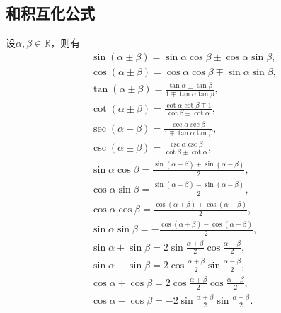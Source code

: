 \subsection{和积互化公式}
\begin{theorem}[和积互化公式]
设\(\alpha,\beta\in\mathbb{R}\)，则有
\begin{gather}
	\sin(\alpha\pm\beta) = \sin\alpha\cos\beta\pm\cos\alpha\sin\beta,
	\label{equation:函数.三角函数.和积互化公式1} \\
	\cos(\alpha\pm\beta) = \cos\alpha\cos\beta\mp\sin\alpha\sin\beta,
	\label{equation:函数.三角函数.和积互化公式2} \\
	\tan(\alpha\pm\beta) = \frac{\tan\alpha\pm\tan\beta}{1\mp\tan\alpha\tan\beta},
	\label{equation:函数.三角函数.和积互化公式3} \\
	\cot(\alpha\pm\beta) = \frac{\cot\alpha\cot\beta\mp 1}{\cot\beta\pm\cot\alpha},
	\label{equation:函数.三角函数.和积互化公式4} \\
	\sec(\alpha\pm\beta) = \frac{\sec\alpha\sec\beta}{1\mp\tan\alpha\tan\beta},
	\label{equation:函数.三角函数.和积互化公式5} \\
	\csc(\alpha\pm\beta) = \frac{\csc\alpha\csc\beta}{\cot\beta\pm\cot\alpha},
	\label{equation:函数.三角函数.和积互化公式6} \\
	\sin \alpha \cos \beta = \frac{\sin (\alpha + \beta) + \sin (\alpha - \beta)}{2},
	\label{equation:函数.三角函数.和积互化公式7} \\
	\cos \alpha \sin \beta = \frac{\sin (\alpha + \beta) - \sin (\alpha - \beta)}{2},
	\label{equation:函数.三角函数.和积互化公式8} \\
	\cos \alpha \cos \beta = \frac{\cos (\alpha + \beta) + \cos (\alpha - \beta)}{2},
	\label{equation:函数.三角函数.和积互化公式9} \\
	\sin \alpha \sin \beta = -\frac{\cos (\alpha + \beta) - \cos (\alpha - \beta)}{2},
	\label{equation:函数.三角函数.和积互化公式10} \\
	\sin \alpha + \sin \beta = 2 \sin \frac{\alpha + \beta}{2} \cos \frac{\alpha - \beta}{2},
	\label{equation:函数.三角函数.和积互化公式11} \\
	\sin \alpha - \sin \beta = 2 \cos \frac{\alpha + \beta}{2} \sin \frac{\alpha - \beta}{2},
	\label{equation:函数.三角函数.和积互化公式12} \\
	\cos \alpha + \cos \beta = 2 \cos \frac{\alpha + \beta}{2} \cos \frac{\alpha - \beta}{2},
	\label{equation:函数.三角函数.和积互化公式13} \\
	\cos \alpha - \cos \beta = -2 \sin \frac{\alpha + \beta}{2} \sin \frac{\alpha - \beta}{2}.

\end{gather}
\end{theorem}
